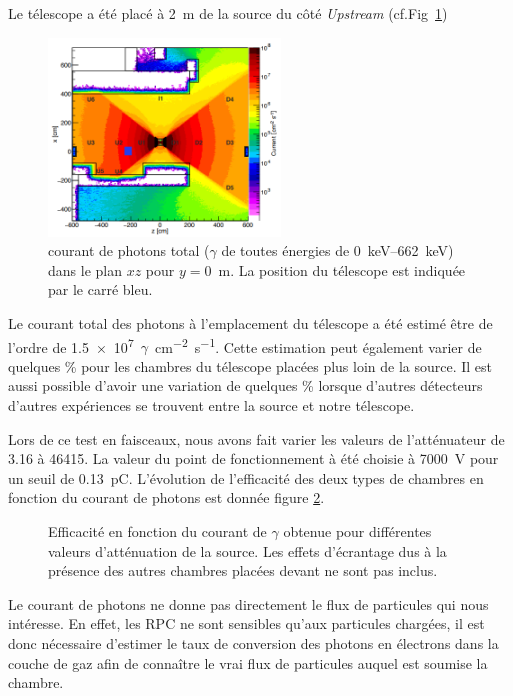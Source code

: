 Le télescope a été placé à \SI{2}{\meter} de la source du côté \textit{Upstream} (cf.Fig~\ref{PositionChambre})

\begin{figure}[!ht]
	\centering
	\includegraphics[width=0.55\textwidth]{GLA/PositionChamber.png}
	\caption{courant de photons total ($\gamma$ de toutes énergies de \SIrange{0}{662}{\kilo\eV}) dans le plan $xz$ pour $y=$\SI{0}{\meter}. La position du télescope est indiquée par le carré bleu.}
	\label{PositionChambre}
\end{figure}

Le courant total des photons à l'emplacement du télescope a été estimé être de l'ordre de \num{1.5e7}~$\gamma$~\si{cm^{-2}.s^{-1}}. Cette estimation peut également varier de quelques \% pour les chambres du télescope placées plus loin de la source. Il est aussi possible d'avoir une variation de quelques \% lorsque d'autres détecteurs d'autres expériences se trouvent entre la source et notre télescope.

Lors de ce test en faisceaux, nous avons fait varier les valeurs de l'atténuateur de \num{3.16} à \num{46415}. La valeur du point de fonctionnement à été choisie à \SI{7000}{\volt} pour un seuil de \SI{0.13}{\pico\coulomb}. L'évolution de l'efficacité des deux types de chambres en fonction du courant de photons est donnée figure \ref{ATTENUATEURGIF}.

\begin{figure}[!ht]
	\centering
	\caption{Efficacité en fonction du courant de $\gamma$ obtenue pour différentes valeurs d'atténuation de la source. Les effets d'écrantage dus à la présence des autres chambres placées devant ne sont pas inclus.}
	\label{ATTENUATEURGIF}
\end{figure}

Le courant de photons ne donne pas directement le flux de particules qui nous intéresse. En effet, les RPC ne sont sensibles qu'aux particules chargées, il est donc nécessaire d'estimer le taux de conversion des photons en électrons dans la couche de gaz afin de connaître le vrai flux de particules auquel est soumise la chambre. 


